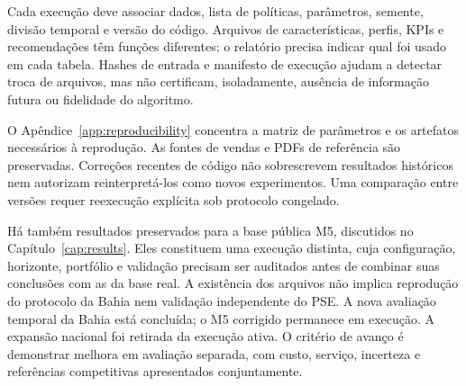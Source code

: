 Cada execução deve associar dados, lista de políticas, parâmetros, semente, divisão temporal e versão do código. Arquivos de características, perfis, KPIs e recomendações têm funções diferentes; o relatório precisa indicar qual foi usado em cada tabela. Hashes de entrada e manifesto de execução ajudam a detectar troca de arquivos, mas não certificam, isoladamente, ausência de informação futura ou fidelidade do algoritmo.

O Apêndice~\ref{app:reproducibility} concentra a matriz de parâmetros e os artefatos necessários à reprodução. As fontes de vendas e PDFs de referência são preservadas. Correções recentes de código não sobrescrevem resultados históricos nem autorizam reinterpretá-los como novos experimentos. Uma comparação entre versões requer reexecução explícita sob protocolo congelado.

Há também resultados preservados para a base pública M5, discutidos no Capítulo~\ref{cap:results}. Eles constituem uma execução distinta, cuja configuração, horizonte, portfólio e validação precisam ser auditados antes de combinar suas conclusões com as da base real. A existência dos arquivos não implica reprodução do protocolo da Bahia nem validação independente do PSE. A nova avaliação temporal da Bahia está concluída; o M5 corrigido permanece em execução. A expansão nacional foi retirada da execução ativa. O critério de avanço é demonstrar melhora em avaliação separada, com custo, serviço, incerteza e referências competitivas apresentados conjuntamente.

